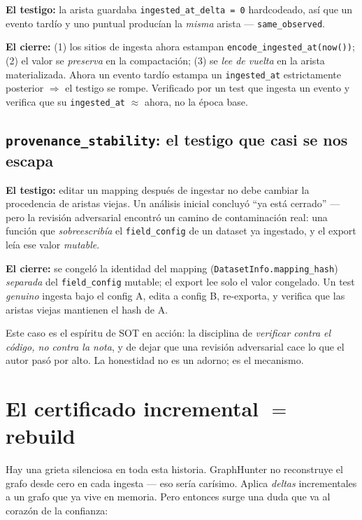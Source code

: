 \documentclass[11pt,a4paper]{article}
\newcommand{\code}[1]{\texttt{\small #1}}
\begin{document}
\textbf{El testigo:} la arista guardaba \code{ingested\_at\_delta = 0}
hardcodeado, así que un evento tardío y uno puntual producían la
\emph{misma} arista --- \code{same\_observed}.

\textbf{El cierre:} (1) los sitios de ingesta ahora estampan
\code{encode\_ingested\_at(now())}; (2) el valor se \emph{preserva} en la
compactación; (3) se \emph{lee de vuelta} en la arista materializada. Ahora un
evento tardío estampa un \code{ingested\_at} estrictamente posterior
$\Rightarrow$ el testigo se rompe. Verificado por un test que ingesta un
evento y verifica que su \code{ingested\_at} $\approx$ ahora, no la época base.

\subsection{\texttt{provenance\_stability}: el testigo que casi se nos escapa}

\textbf{El testigo:} editar un mapping después de ingestar no debe cambiar la
procedencia de aristas viejas. Un análisis inicial concluyó ``ya está cerrado''
--- pero la revisión adversarial encontró un camino de contaminación real: una
función que \emph{sobreescribía} el \code{field\_config} de un dataset ya
ingestado, y el export leía ese valor \emph{mutable}.

\textbf{El cierre:} se congeló la identidad del mapping
(\code{DatasetInfo.mapping\_hash}) \emph{separada} del \code{field\_config}
mutable; el export lee solo el valor congelado. Un test \emph{genuino} ingesta
bajo el config A, edita a config B, re-exporta, y verifica que las aristas
viejas mantienen el hash de A.

\begin{ideabox}[La lección]
Este caso es el espíritu de SOT en acción: la disciplina de \emph{verificar
contra el código, no contra la nota}, y de dejar que una revisión adversarial
cace lo que el autor pasó por alto. La honestidad no es un adorno; es el
mecanismo.
\end{ideabox}

\section{El certificado incremental $=$ rebuild}

Hay una grieta silenciosa en toda esta historia. GraphHunter no reconstruye el
grafo desde cero en cada ingesta --- eso sería carísimo. Aplica \emph{deltas}
incrementales a un grafo que ya vive en memoria. Pero entonces surge una duda
que va al corazón de la confianza:
\end{document}
